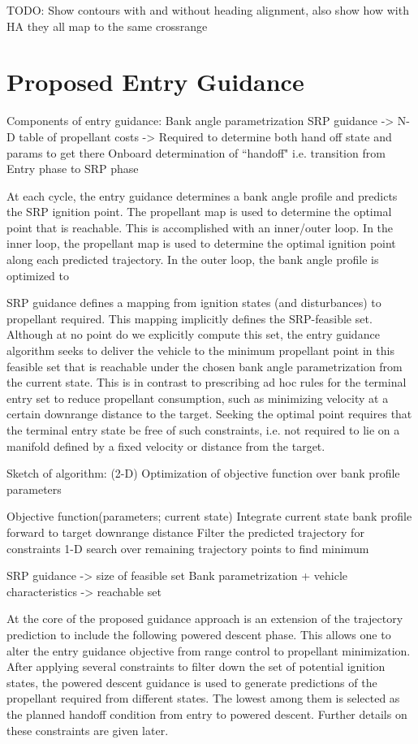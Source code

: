 \documentclass[letterpaper, preprint, paper,11pt]{AAS}
\begin{document}
TODO: Show contours with and without heading alignment, also show how with HA they all map to the same crossrange

\section{Proposed Entry Guidance}

Components of entry guidance: 
Bank angle parametrization
SRP guidance -> N-D table of propellant costs -> Required to determine both hand off state and params to get there 
Onboard determination of ``handoff" i.e. transition from Entry phase to SRP phase 

At each cycle, the entry guidance determines a bank angle profile and predicts the SRP ignition point. The propellant map is used to determine the optimal point that is reachable. This is accomplished with an inner/outer loop. In the inner loop, the propellant map is used to determine the optimal ignition point along each predicted trajectory. In the outer loop, the bank angle profile is optimized to

SRP guidance defines a mapping from ignition states (and disturbances) to propellant required. This mapping implicitly defines the SRP-feasible set. Although at no point do we explicitly compute this set, the entry guidance algorithm seeks to deliver the vehicle to the minimum propellant point in this feasible set that is reachable under the chosen bank angle parametrization from the current state. This is in contrast to prescribing ad hoc rules for the terminal entry set to reduce propellant consumption, such as minimizing velocity at a certain downrange distance to the target. Seeking the optimal point requires that the terminal entry state be free of such constraints, i.e. not required to lie on a manifold defined by a fixed velocity or distance from the target. 

Sketch of algorithm: 
(2-D) Optimization of objective function over bank profile parameters

Objective function(parameters; current state)
Integrate current state bank profile forward to target downrange distance
Filter the predicted trajectory for constraints
1-D search over remaining trajectory points to find minimum

SRP guidance -> size of feasible set
Bank parametrization + vehicle characteristics -> reachable set


At the core of the proposed guidance approach is an extension of the trajectory prediction to include the following powered descent phase. This allows one to alter the entry guidance objective from range control to propellant minimization. After applying several constraints to filter down the set of potential ignition states, the powered descent guidance is used to generate predictions of the propellant required from different states. The lowest among them is selected as the planned handoff condition from entry to powered descent. Further details on these constraints are given later.
\end{document}
